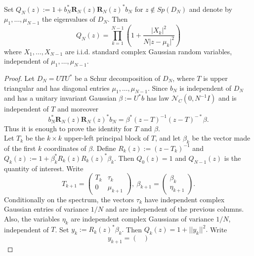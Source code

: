 \documentclass[10pt,a4paper]{amsart}
\begin{document}
\begin{lemma}
   Set $Q_N(z):=1+b_N^*\mathbf{R}_{N}(z)\mathbf{R}_{N}(z)^*b_N$ for $z \notin Sp (D_N)$ and denote by $\mu_1,\ldots,\mu_{N-1}$ the eigenvalues of $D_N$. Then 
   \begin{equation*}
       Q_N(z) \overset{}{=} \prod_{k=1}^{N-1}\left(1+\frac{\lvert X_k\lvert^2}{N\lvert z- \mu_k \lvert^2}\right)
   \end{equation*}
   where $X_1,\ldots,X_{N-1}$ are i.i.d. standard complex Gaussian random variables, independent of $\mu_1,\ldots,\mu_{N-1}.$
\end{lemma}

\begin{proof}
    Let $D_N=UTU^*$ be a Schur decomposition of $D_N$, where $T$ is upper triangular and has diagonal entries $\mu_1,\ldots, \mu_{N-1}$. Since $b_N$ is independent of $D_N$ and has a unitary invariant Gaussian $\beta:=U^*b$ has law $\mathcal{N}_{C}(0,N^{-1}I)$ and is independent of $T$ and moreover 
    \begin{equation*}
        b_N^*\mathbf{R}_{N}(z)\mathbf{R}_{N}(z)^*b_N=\beta ^*(z-T)^{-1}(z-T)^{-*}\beta.
    \end{equation*}
    Thus it is enough to prove the identity for $T$ and $\beta$. \\
    Let $T_k $ be the $k\times k$ upper-left principal block of $T$, and let $\beta_k$ be the vector made of the first $k$ coordinates of $\beta.$ Define $R_k(z):=(z-T_k)^{-1}$ and $Q_k(z):=1+\beta_k^* R_k(z)R_k(z)^*\beta_k.$ Then $Q_0(z)=1$ and $Q_{N-1}(z)$ is the quantity of interest. Write 
    \begin{equation*}
        T_{k+1}= \begin{pmatrix}
        T_k&\tau_k\\
        0&\mu_{k+1}
    \end{pmatrix}, \ \beta_{k+1}=\begin{pmatrix}
        \beta_k\\
        \eta_{k+1}
    \end{pmatrix}.
    \end{equation*}
    Conditionally on the spectrum, the vectors $\tau_k$ have independent complex Gaussian entries of variance $1/N$ and are independent of the previous columns. Also, the variables $\eta_k$ are independent complex Gaussians of variance $1/N$, independent of $T$. Set $y_k:=R_k(z)^*\beta_k.$ Then $Q_k(z)=1+ \lvert \lvert y_k \lvert \lvert ^2.$ Write 
    \begin{equation*}
        y_{k+1}=\begin{pmatrix}

\end{pmatrix}
\end{equation*}
\end{proof}
\end{document}

